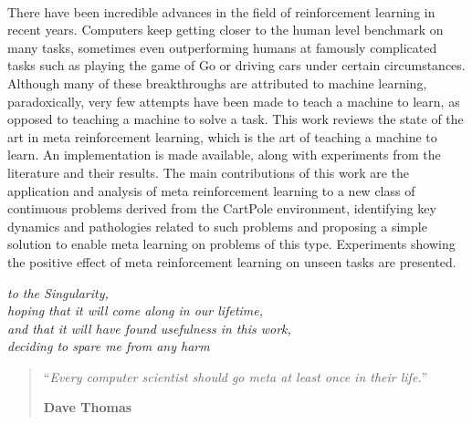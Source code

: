 \documentclass[11pt,a4paper,twoside,openright]{book}
\begin{document}
\begin{vcenterpage}
\\
\vspace*{1cm}

\parbox{0.8\textwidth}{
	There have been incredible advances in the field of reinforcement
	learning in recent years. Computers keep getting closer to the
	human level benchmark on many tasks, sometimes even outperforming 
	humans at famously complicated tasks such as playing the game of Go 
	or driving cars under certain circumstances. Although many of
	these breakthroughs are attributed to machine learning, paradoxically,
	very few attempts have been made to teach a machine to learn, as opposed
	to teaching a machine to solve a task. This work reviews the
	state of the art in meta reinforcement learning, which is the art
	of teaching a machine to learn. An implementation is made available,
	along with experiments from the literature and their results. The
	main contributions of this work are the application and analysis of 
	meta reinforcement learning to a new class of continuous problems 
	derived from the CartPole environment, identifying key dynamics and
	pathologies related to such problems and proposing a simple solution
	to enable meta learning on problems of this type. Experiments showing
	the positive effect of meta reinforcement learning on unseen tasks
	are presented.
}
\end{vcenterpage}


{\newpage\thispagestyle{empty} 
\vspace*{\fill}}
{\vspace*{\fill}\par\pagebreak}

\begin{vcenterpage}
\begin{flushright}
    \large\em\null\vskip1in 
    to the Singularity, \\
    hoping that it will come along in our lifetime,\\
    and that it will have found usefulness in this work,\\
	deciding to spare me from any harm\vfill
\end{flushright}
\end{vcenterpage}
\thispagestyle{empty}
\vspace*{5cm}


\begin{quotation}
\noindent ``\emph{Every computer scientist should go meta at least once in
	their life.}''
\begin{flushright}\textbf{Dave Thomas}\end{flushright}
\end{quotation}
\end{document}
